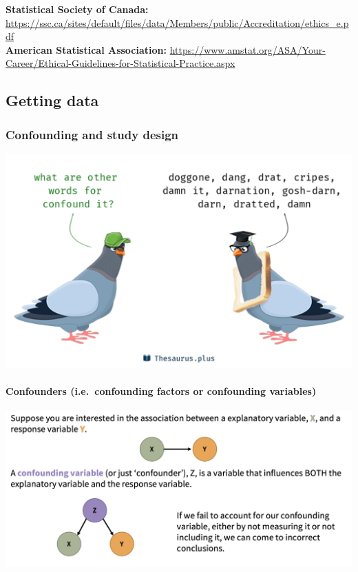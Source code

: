 \documentclass[
  openany]{book}
\begin{document}
\textbf{Statistical Society of Canada:} \url{https://ssc.ca/sites/default/files/data/Members/public/Accreditation/ethics_e.pdf}\\
\textbf{American Statistical Association:} \url{https://www.amstat.org/ASA/Your-Career/Ethical-Guidelines-for-Statistical-Practice.aspx}

\hypertarget{getting-data}{%
\subsection{Getting data}\label{getting-data}}

\hypertarget{confounding-and-study-design}{%
\subsubsection{Confounding and study design}\label{confounding-and-study-design}}

\begin{center}\includegraphics[width=0.7\linewidth]{images/m2/confounding} \end{center}

\hypertarget{confounders-i.e.-confounding-factors-or-confounding-variables}{%
\paragraph{Confounders (i.e.~confounding factors or confounding variables)}\label{confounders-i.e.-confounding-factors-or-confounding-variables}}

\begin{center}\includegraphics[width=1\linewidth]{images/m2/confounding_image} \end{center}
\end{document}
